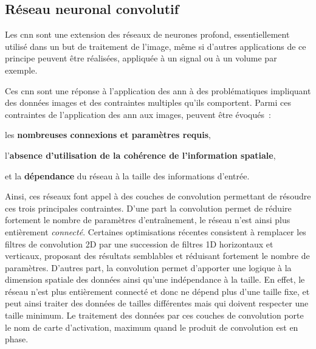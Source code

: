 \subsection{Réseau neuronal convolutif}
\label{sec:convolutionnal_neural_network}
Les \gls{cnn} sont une extension des réseaux de neurones profond, essentiellement utilisé dans un but de traitement de l'image, même si d'autres applications de ce principe peuvent être réalisées, appliquée à un signal ou à un volume par exemple.\par

Ces \gls{cnn} sont une réponse à l'application des \gls{ann} à des problématiques impliquant des données images et des contraintes multiples qu'ils comportent. Parmi ces contraintes de l'application des \gls{ann} aux images, peuvent être évoqués~: 
\begin{inlinerate}
    \item les \textbf{nombreuses connexions et paramètres requis},
    \item l'\textbf{absence d'utilisation de la cohérence de l'information spatiale},
    \item et la \textbf{dépendance} du réseau à la taille des informations d'entrée.
\end{inlinerate}\par

Ainsi, ces réseaux font appel à des couches de convolution permettant de résoudre ces trois principales contraintes. D'une part la convolution permet de réduire fortement le nombre de paramètres d'entraînement, le réseau n'est ainsi plus entièrement \textit{connecté}. Certaines optimisations récentes consistent à remplacer les filtres de convolution 2D par une succession de filtres 1D horizontaux et verticaux, proposant des résultats semblables et réduisant fortement le nombre de paramètres. D'autres part, la convolution permet d'apporter une logique à la dimension spatiale des données ainsi qu'une indépendance à la taille. En effet, le réseau n'est plus entièrement connecté et donc ne dépend plus d'une taille fixe, et peut ainsi traiter des données de tailles différentes mais qui doivent respecter une taille minimum. Le traitement des données par ces couches de convolution porte le nom de carte d'activation, maximum quand le produit de convolution est en phase.\par


